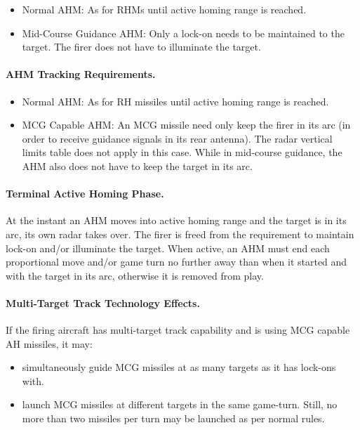 \begin{itemize}

    \item Normal AHM: As for RHMs until active homing range is reached.

    \item Mid-Course Guidance AHM: Only a lock-on needs to be maintained to the target. The firer does not have to illuminate the target.  

\end{itemize}

\paragraph{AHM Tracking Requirements.}

\begin{itemize}

    \item Normal AHM: As for RH missiles until active homing range is reached.

    \item MCG Capable AHM: An MCG missile need only keep the firer in its  arc (in order to receive guidance signals in its rear antenna). The radar vertical limits table does not apply in this case. While in mid-course guidance, the AHM also does not have to keep the target in its  arc.

\end{itemize}

\paragraph{Terminal Active Homing Phase.} At the instant an AHM moves into active homing range and the target is in its  arc, its own radar takes over. The firer is freed from the requirement to maintain lock-on and/or illuminate the target.  When active, an AHM must end each proportional move and/or game turn no further away than when it started and with the target in its  arc, otherwise it is removed from play.

\paragraph{Multi-Target Track Technology Effects.} If the firing aircraft has multi-target track capability and is using MCG capable AH missiles, it may:

\begin{itemize}

    \item simultaneously guide MCG missiles at as many targets as it has lock-ons with.

    \item launch MCG missiles at different targets in the same game-turn. Still, no more than two missiles per turn may be launched as per normal rules.

\end{itemize}


